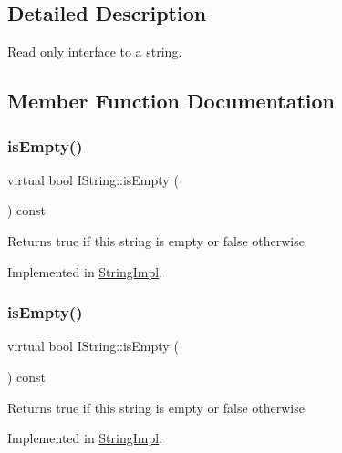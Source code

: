 \subsection{Detailed Description}
Read only interface to a string. 

\subsection{Member Function Documentation}
\mbox{\label{class_i_string_a85fee593e5cae3324834b6c02ceb6ae1}} 
\subsubsection{\texorpdfstring{isEmpty()}{isEmpty()}\hspace{0.1cm}{\footnotesize\ttfamily [1/2]}}
{\footnotesize\ttfamily virtual bool I\+String\+::is\+Empty (\begin{DoxyParamCaption}{ }\end{DoxyParamCaption}) const\hspace{0.3cm}{\ttfamily [pure virtual]}}

Returns true if this string is empty or false otherwise 

Implemented in \mbox{\hyperlink{class_string_impl_a96cd2f042d397934171ebde8dd6f61ad}{String\+Impl}}.

\mbox{\label{class_i_string_a85fee593e5cae3324834b6c02ceb6ae1}} 
\subsubsection{\texorpdfstring{isEmpty()}{isEmpty()}\hspace{0.1cm}{\footnotesize\ttfamily [2/2]}}
{\footnotesize\ttfamily virtual bool I\+String\+::is\+Empty (\begin{DoxyParamCaption}{ }\end{DoxyParamCaption}) const\hspace{0.3cm}{\ttfamily [pure virtual]}}

Returns true if this string is empty or false otherwise 

Implemented in \mbox{\hyperlink{class_string_impl_a96cd2f042d397934171ebde8dd6f61ad}{String\+Impl}}.

